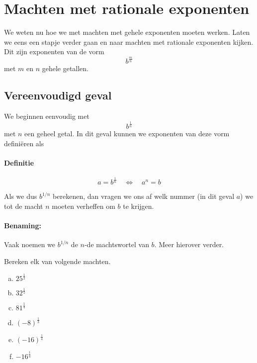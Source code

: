 \documentclass[12pt,twoside]{article}
\begin{document}
\pagebreak
\section{Machten met rationale exponenten}

We weten nu hoe we met machten met gehele exponenten moeten werken. Laten we eens een stapje verder gaan en naar machten met rationale exponenten kijken. Dit zijn exponenten van de vorm
$$b^{\frac{m}{n}}$$
met $m$ en $n$ gehele getallen.

\subsection{Vereenvoudigd geval}

We beginnen eenvoudig met
$$b^{\frac{1}{n}}$$
met $n$ een geheel getal. In dit geval kunnen we exponenten van deze vorm definiëren als
\paragraph{Definitie}
\begin{mdframed}
  $$a=b^{\frac{1}{n}} \quad\Leftrightarrow\quad a^n=b$$
\end{mdframed}
Als we dus $b^{1/n}$ berekenen, dan vragen we ons af welk nummer (in dit geval $a$) we tot de macht $n$ moeten verheffen om $b$ te krijgen.

\paragraph{Benaming:} Vaak noemen we $b^{1/n}$ de $n$-de machtswortel van $b$. Meer hierover verder.

\begin{oefening}
  Bereken elk van volgende machten.
  \begin{multicols}{3}
    \begin{enumerate}[(a)]
      \itemsep1em
    \item $25^{\frac{1}{2}}$
    \item $32^{\frac{1}{5}}$
    \item $81^{\frac{1}{4}}$
    \item $(-8)^{\frac{1}{3}}$
    \item $(-16)^{\frac{1}{4}}$
    \item $-16^{\frac{1}{4}}$
    \end{enumerate}
  \end{multicols}
\end{oefening}
\end{document}
